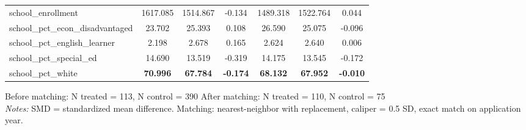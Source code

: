 \begin{table}[t]
\begin{tabular*}{\linewidth}{@{\extracolsep{\fill}}l|cccccc}
school\_enrollment & 1617.085 & 1514.867 & -0.134 & 1489.318 & 1522.764 & 0.044 \\ 
school\_pct\_econ\_disadvantaged & 23.702 & 25.393 & 0.108 & 26.590 & 25.075 & -0.096 \\ 
school\_pct\_english\_learner & 2.198 & 2.678 & 0.165 & 2.624 & 2.640 & 0.006 \\ 
school\_pct\_special\_ed & 14.690 & 13.519 & -0.319 & 14.175 & 13.545 & -0.172 \\ 
school\_pct\_white & {\bfseries 70.996} & {\bfseries 67.784} & {\bfseries -0.174} & {\bfseries 68.132} & {\bfseries 67.952} & {\bfseries -0.010} \\ 
\bottomrule
\end{tabular*}
\begin{minipage}{\linewidth}
\vspace{.05em}
Before matching: N treated = 113, N control = 390 \textbar{} After matching: N treated = 110, N control = 75\\
\emph{Notes:} SMD = standardized mean difference. Matching: nearest-neighbor with replacement, caliper = 0.5 SD, exact match on application year.\\
\end{minipage}
\end{table}

